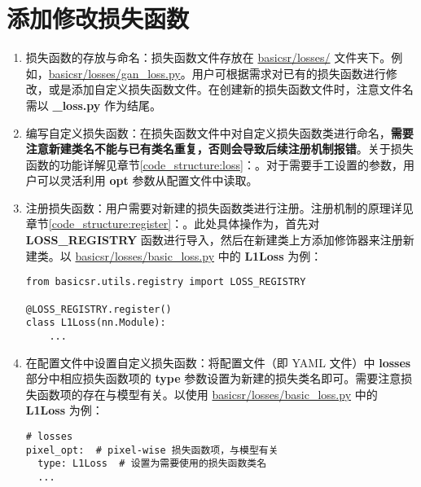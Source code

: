 \documentclass[../main.tex]{subfiles}
\begin{document}
\section{添加修改损失函数}\label{howto:add_loss}

\begin{enumerate}[第 1 步]
    \item 损失函数的存放与命名：损失函数文件存放在 \href{https://github.com/XPixelGroup/BasicSR/tree/master/basicsr/losses}{basicsr/losses/} 文件夹下。例如，\href{https://github.com/XPixelGroup/BasicSR/blob/master/basicsr/losses/gan_loss.py}{basicsr/losses/gan\_loss.py}。用户可根据需求对已有的损失函数进行修改，或是添加自定义损失函数文件。在创建新的损失函数文件时，注意文件名需以  \textbf{\_loss.py} 作为结尾。

    \item 编写自定义损失函数：在损失函数文件中对自定义损失函数类进行命名，\textbf{需要注意新建类名不能与已有类名重复，否则会导致后续注册机制报错}。关于损失函数的功能详解见章节\ref{code_structure:loss}：。对于需要手工设置的参数，用户可以灵活利用 \textbf{opt} 参数从配置文件中读取。

    \item 注册损失函数：用户需要对新建的损失函数类进行注册。注册机制的原理详见章节\ref{code_structure:register}：。此处具体操作为，首先对 \textbf{LOSS\_REGISTRY} 函数进行导入，然后在新建类上方添加修饰器来注册新建类。以 \href{https://github.com/XPixelGroup/BasicSR/blob/master/basicsr/losses/basic_loss.py}{basicsr/losses/basic\_loss.py} 中的 \textbf{L1Loss} 为例：
          \begin{verbatim}
from basicsr.utils.registry import LOSS_REGISTRY

@LOSS_REGISTRY.register()
class L1Loss(nn.Module):
    ...
\end{verbatim}

    \item 在配置文件中设置自定义损失函数：将配置文件（即 YAML 文件）中 \textbf{losses} 部分中相应损失函数项的 \textbf{type} 参数设置为新建的损失类名即可。需要注意损失函数项的存在与模型有关。以使用 \href{https://github.com/XPixelGroup/BasicSR/tree/master/basicsr/losses/basic_loss.py}{basicsr/losses/basic\_loss.py} 中的 \textbf{L1Loss} 为例：
          \begin{verbatim}
# losses
pixel_opt:  # pixel-wise 损失函数项，与模型有关
  type: L1Loss  # 设置为需要使用的损失函数类名
  ...
\end{verbatim}
\end{enumerate}
\end{document}

